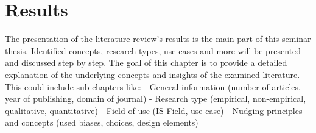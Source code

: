 \section{Results}
The presentation of the literature review’s results is the main part of this seminar thesis. Identified concepts, research types, use cases and more will be presented and discussed step by step. The goal of this chapter is to provide a detailed explanation of the underlying concepts and insights of the examined literature. This could include sub chapters like:
-	General information (number of articles, year of publishing, domain of journal)
-	Research type (empirical, non-empirical, qualitative, quantitative)
-	Field of use (IS Field, use case)
-	Nudging principles and concepts (used biases, choices, design elements)
